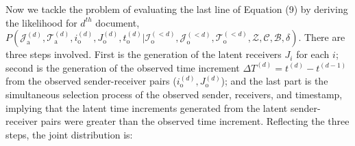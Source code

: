 \documentclass[a4paper]{article}
\begin{document}
  	       Now we tackle the problem of evaluating the last line of Equation (9) by deriving the likelihood for $d^{th}$ document, $P(\mathcal{J}^{(d)}_{\mbox{a}}, \mathcal{T}^{(d)}_{\mbox{a}}, i^{(d)}_{\mbox{o}}, J^{(d)}_{\mbox{o}}, t^{(d)}_{\mbox{o}} |\mathcal{I}^{(<d)}_{\mbox{o}}, \mathcal{J}^{(<d)}_{\mbox{o}}, \mathcal{T}^{(<d)}_{\mbox{o}}, \mathcal{Z}, \mathcal{C}, \mathcal{B}, \delta)$. There are three steps involved. First is the generation of the latent receivers $J_i$ for each $i$; second is the generation of the observed time increment $\Delta T^{(d)} = t^{(d)} - t^{(d-1)}$ from the observed sender-receiver pairs ($i^{(d)}_{\mbox{o}}, J^{(d)}_{\mbox{o}}$); and the last part is the simultaneous selection process of the observed sender, receivers, and timestamp, implying that the latent time increments generated from the latent sender-receiver pairs were greater than the observed time increment. Reflecting the three steps, the joint distribution is:\\
\end{document}
